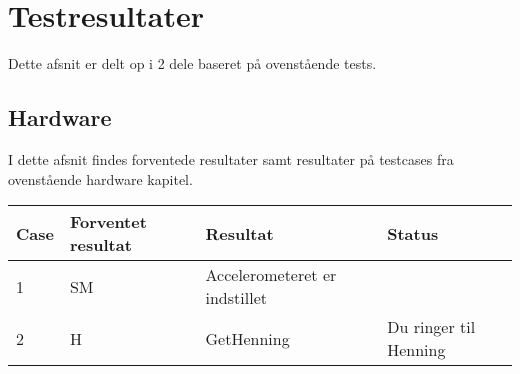 \section{Testresultater}
Dette afsnit er delt op i  2 dele baseret på ovenstående tests.\\
\subsection{Hardware}
I dette afsnit findes forventede resultater samt resultater på testcases fra ovenstående hardware kapitel.\\
\begin{table}[htbp]
\centering
\begin{tabular}{| p{1.5cm}  | p{3cm} | p{4.5cm} | p{4.5cm} |}
\hline
Case &Forventet resultat &Resultat &Status\\\hline
1 &SM &Accelerometeret er indstillet & \\\hline
2 &H &GetHenning &Du ringer til Henning\\\hline
\end{tabular}
\end{table}
